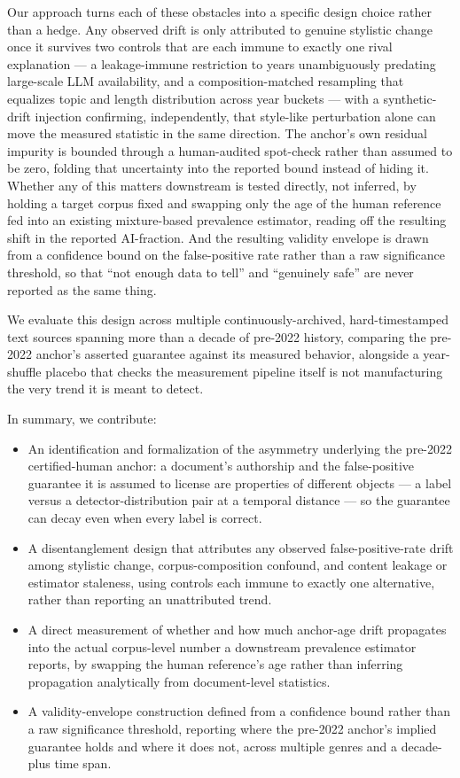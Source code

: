 \documentclass[11pt]{article}
\begin{document}
Our approach turns each of these obstacles into a specific design choice rather than a hedge. Any observed drift is only attributed to genuine stylistic change once it survives two controls that are each immune to exactly one rival explanation --- a leakage-immune restriction to years unambiguously predating large-scale LLM availability, and a composition-matched resampling that equalizes topic and length distribution across year buckets --- with a synthetic-drift injection confirming, independently, that style-like perturbation alone can move the measured statistic in the same direction. The anchor's own residual impurity is bounded through a human-audited spot-check rather than assumed to be zero, folding that uncertainty into the reported bound instead of hiding it. Whether any of this matters downstream is tested directly, not inferred, by holding a target corpus fixed and swapping only the age of the human reference fed into an existing mixture-based prevalence estimator, reading off the resulting shift in the reported AI-fraction. And the resulting validity envelope is drawn from a confidence bound on the false-positive rate rather than a raw significance threshold, so that ``not enough data to tell'' and ``genuinely safe'' are never reported as the same thing.

We evaluate this design across multiple continuously-archived, hard-timestamped text sources spanning more than a decade of pre-2022 history, comparing the pre-2022 anchor's asserted guarantee against its measured behavior, alongside a year-shuffle placebo that checks the measurement pipeline itself is not manufacturing the very trend it is meant to detect.

In summary, we contribute:
\begin{itemize}[leftmargin=1.4em]
\item An identification and formalization of the asymmetry underlying the pre-2022 certified-human anchor: a document's authorship and the false-positive guarantee it is assumed to license are properties of different objects --- a label versus a detector-distribution pair at a temporal distance --- so the guarantee can decay even when every label is correct.
\item A disentanglement design that attributes any observed false-positive-rate drift among stylistic change, corpus-composition confound, and content leakage or estimator staleness, using controls each immune to exactly one alternative, rather than reporting an unattributed trend.
\item A direct measurement of whether and how much anchor-age drift propagates into the actual corpus-level number a downstream prevalence estimator reports, by swapping the human reference's age rather than inferring propagation analytically from document-level statistics.
\item A validity-envelope construction defined from a confidence bound rather than a raw significance threshold, reporting where the pre-2022 anchor's implied guarantee holds and where it does not, across multiple genres and a decade-plus time span.
\end{itemize}
\end{document}
